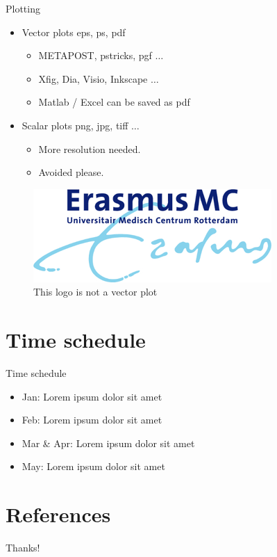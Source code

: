 \documentclass{beamer}
\begin{document}
\begin{frame}{Plotting}
    \begin{itemize}
        \item Vector plots eps, ps, pdf
        \begin{itemize}
            \item METAPOST, pstricks, pgf $\ldots$
            \item Xfig, Dia, Visio, Inkscape $\ldots$
            \item Matlab / Excel can be saved as pdf
        \end{itemize}
        \item Scalar plots png, jpg, tiff $\ldots$
        \begin{itemize}
            \item More resolution needed.
            \item Avoided please.
        \end{itemize}
    \end{itemize}
    \begin{figure}[htpb]
        \centering
        \includegraphics[width=0.2\linewidth]{pic/erasmusmc_logo.png}
        \caption{This logo is not a vector plot}
    \end{figure}
\end{frame}

\section{Time schedule}
\begin{frame}{Time schedule}
    \begin{itemize}
        \item Jan: Lorem ipsum dolor sit amet
        \item Feb: Lorem ipsum dolor sit amet
        \item Mar \& Apr: Lorem ipsum dolor sit amet
        \item May: Lorem ipsum dolor sit amet
    \end{itemize}
\end{frame}

\section{References}

\begin{frame}[allowframebreaks]
    \printbibliography[heading=none]
\end{frame}

\begin{frame}
    \begin{center}
        {\Huge\calligra Thanks!}
    \end{center}
\end{frame}
\end{document}
